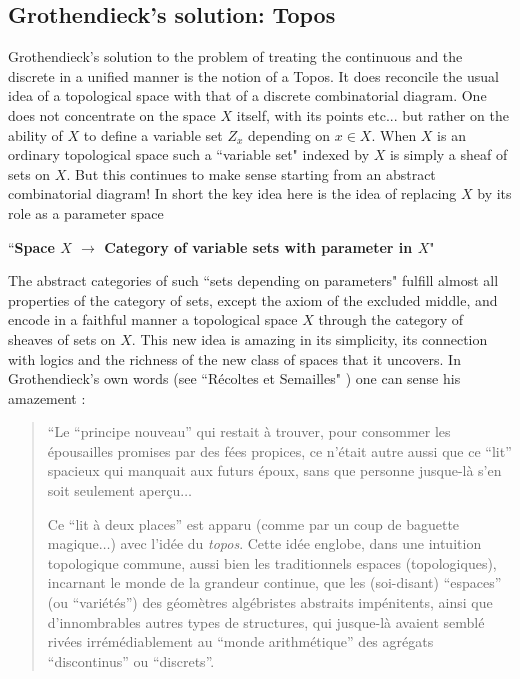 \documentclass[12pt]{article}
\begin{document}
\subsection{Grothendieck's solution: Topos}

 Grothendieck's solution to the problem of treating the continuous and the discrete in a unified manner is the notion of a Topos.  It does reconcile the usual idea of a topological space with that of a discrete combinatorial diagram. One does not concentrate on the space $X$ itself, with  its points etc... but rather on the ability of $X$ to define a variable set $Z_x$ depending on $x\in X$. When $X$ is an ordinary topological space such a ``variable set" indexed by $X$ is simply a sheaf of sets on $X$. But this continues to make sense starting from
 an abstract combinatorial diagram!  In short the key idea here is the idea of replacing $X$ by its role as a parameter space  
 
 \vspace{0.5cm}
 
 \centerline{``{\bf Space $X$ $\to$ Category of variable sets with parameter in $X$}" }
 
 \vspace{0.5cm}
 
 The abstract categories of such ``sets depending on parameters" fulfill almost all properties of the category of sets, except the axiom of the excluded middle, and encode in a faithful manner a topological space $X$ through the category of sheaves of sets on $X$. This new idea is amazing in its simplicity, its connection with logics and the richness of the new class of spaces that it uncovers.   In Grothendieck's own words (see ``R\' ecoltes et Semailles" \cite{RS,maclarty}) one can sense his amazement : 
{\em
\begin{quote}``Le ``principe nouveau'' qui restait \`a trouver, pour
consommer les \'epousailles promises par des f\'ees propices, ce n'\'etait autre aussi que ce ``lit''
spacieux qui manquait aux futurs \'epoux, sans que personne jusque-l\`a s'en soit seulement
aper\c cu$\ldots$

Ce ``lit \`a deux places'' est apparu (comme par un coup de baguette magique$\ldots$) avec
l'id\'ee du {\it topos}. Cette id\'ee englobe, dans une intuition topologique commune, aussi bien
les traditionnels espaces (topologiques), incarnant le monde de la grandeur continue, que
les (soi-disant) ``espaces'' (ou ``vari\'et\'es'') des g\'eom\`etres alg\'ebristes abstraits imp\'enitents,
ainsi que d'innombrables autres types de structures, qui jusque-l\`a avaient sembl\'e riv\'ees
irr\'em\'ediablement au ``monde arithm\'etique'' des agr\'egats ``discontinus'' ou ``discrets''.\end{quote}}
\end{document}
